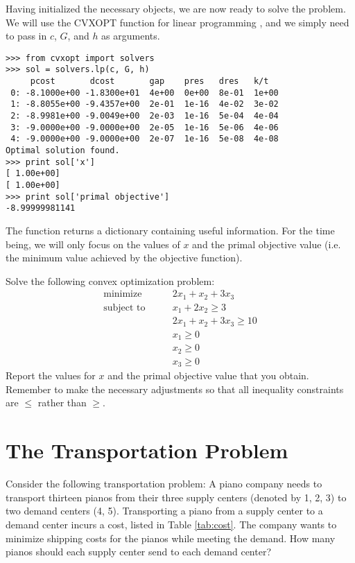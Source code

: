Having initialized the necessary objects, we are now ready to solve the problem.
We will use the CVXOPT function for linear programming , and we simply need to pass in $c$, $G$, and $h$ as arguments.
\begin{lstlisting}
>>> from cvxopt import solvers
>>> sol = solvers.lp(c, G, h)
     pcost       dcost       gap    pres   dres   k/t
 0: -8.1000e+00 -1.8300e+01  4e+00  0e+00  8e-01  1e+00
 1: -8.8055e+00 -9.4357e+00  2e-01  1e-16  4e-02  3e-02
 2: -8.9981e+00 -9.0049e+00  2e-03  1e-16  5e-04  4e-04
 3: -9.0000e+00 -9.0000e+00  2e-05  1e-16  5e-06  4e-06
 4: -9.0000e+00 -9.0000e+00  2e-07  1e-16  5e-08  4e-08
Optimal solution found.
>>> print sol['x']
[ 1.00e+00]
[ 1.00e+00]
>>> print sol['primal objective']
-8.99999981141
\end{lstlisting}
The function  returns a dictionary containing useful information.
For the time being, we will only focus on the values of $x$ and the primal objective value (i.e. the minimum value achieved by
the objective function).
\begin{problem}
Solve the following convex optimization problem:
\begin{align*}
\text{minimize}\qquad &2x_1+x_2+3x_3 \\
\text{subject to}\qquad &x_1+2x_2 \geq 3 \\
	        &2x_1+x_2+3x_3 \geq 10 \\
		&x_1 \geq 0 \\
		&x_2 \geq 0 \\
		&x_3 \geq 0
\end{align*}
Report the values for $x$ and the primal objective value that you obtain.
Remember to make the necessary adjustments so that all inequality constraints are $\leq$ rather than $\geq$.
\end{problem}

\section*{The Transportation Problem}

Consider the following transportation problem:
A piano company needs to transport thirteen pianos from their three  supply centers (denoted by 1, 2, 3) to two demand centers (4, 5).
Transporting a piano from a supply center to a demand center incurs a cost, listed in Table \ref{tab:cost}.
The company wants to minimize shipping costs for the pianos while meeting the demand.
How many pianos should each supply center send to each demand center?

